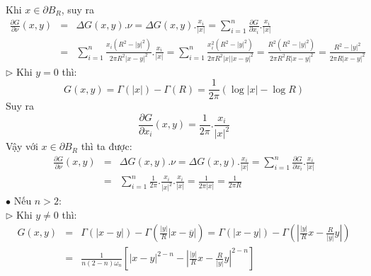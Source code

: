Khi $
x \in \partial B_R 
$, suy ra
\begin{eqnarray}
\frac{{\partial G}}
{{\partial \nu }}\left( {x,y} \right)& = &\Delta G\left( {x,y} \right).\nu  = \Delta G\left( {x,y} \right).\frac{{x_i }}
{{\left| x \right|}} = \sum\limits_{i = 1}^n {\frac{{\partial G}}
{{\partial x_i }}.} \frac{{x_i }}
{{\left| x \right|}}\nonumber\\
& = &\sum\limits_{i = 1}^n {\frac{{x_i \left( {R^2  - \left| y \right|^2 } \right)}}
{{2\pi R^2 \left| {x - y} \right|^2 }}.} \frac{{x_i }}
{{\left| x \right|}} = \sum\limits_{i = 1}^n {\frac{{x_i^2 \left( {R^2  - \left| y \right|^2 } \right)}}
{{2\pi R^2 \left| x \right|\left| {x - y} \right|^2 }}}  = \frac{{R^2 \left( {R^2  - \left| y \right|^2 } \right)}}
{{2\pi R^2 R\left| {x - y} \right|^2 }} = \frac{{R^2  - \left| y \right|^2 }}
{{2\pi R\left| {x - y} \right|^2 }}\nonumber
\end{eqnarray}
$\triangleright$ Khi $
y = 0
$ thì:
\[
G\left( {x,y} \right) = \Gamma \left( {\left| x \right|} \right) - \Gamma \left( R \right) = \frac{1}
{{2\pi }}\left( {\log \left| x \right| - \log R} \right)
\]
Suy ra
\[
\frac{{\partial G}}
{{\partial x_i }}\left( {x,y} \right) = \frac{1}
{{2\pi }}.\frac{{x_i }}
{{\left| x \right|^2 }}
\]
Vậy với $
x \in \partial B_R 
$ thì ta được:
\begin{eqnarray}
\frac{{\partial G}}
{{\partial \nu }}\left( {x,y} \right)& = &\Delta G\left( {x,y} \right).\nu  = \Delta G\left( {x,y} \right).\frac{{x_i }}
{{\left| x \right|}} = \sum\limits_{i = 1}^n {\frac{{\partial G}}
{{\partial x_i }}.} \frac{{x_i }}
{{\left| x \right|}} \nonumber\\
 &=& \sum\limits_{i = 1}^n {\frac{1}
{{2\pi }}.\frac{{x_i }}
{{\left| x \right|^2 }}.} \frac{{x_i }}
{{\left| x \right|}} = \frac{1}
{{2\pi \left| x \right|}} = \frac{1}
{{2\pi R}}\nonumber
\end{eqnarray}
$\bullet$ Nếu $n > 2$:\\
$\triangleright$ Khi $
y \ne 0
$ thì:
\begin{eqnarray}
G\left( {x,y} \right)& = &\Gamma \left( {\left| {x - y} \right|} \right) - \Gamma \left( {\frac{{\left| y \right|}}
{R}\left| {x - \overline y } \right|} \right) = \Gamma \left( {\left| {x - y} \right|} \right) - \Gamma \left( {\left| {\frac{{\left| y \right|}}
{R}x - \frac{R}
{{\left| y \right|}}y} \right|} \right)\nonumber\\
& = &\frac{1}
{{n\left( {2 - n} \right)\omega _n }}\left[ {\left| {x - y} \right|^{2 - n}  - \left| {\frac{{\left| y \right|}}
{R}x - \frac{R}
{{\left| y \right|}}y} \right|^{2 - n} } \right]\nonumber
\end{eqnarray}
